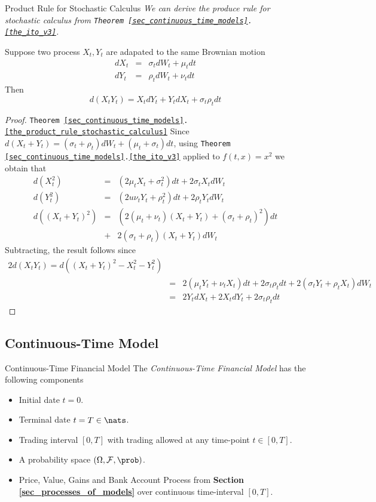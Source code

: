 \documentclass[11pt,a4paper]{article}
\begin{document}
  \begin{theorem}{Product Rule for Stochastic Calculus}\label{the_product_rule_stochastic_calculus}
    \textit{We can derive the produce rule for stochastic calculus from \texttt{Theorem \ref{sec_continuous_time_models}.\ref{the_ito_v3}}.}
    \par Suppose two process $X_t,Y_t$ are adapated to the same Brownian motion
    \[\begin{array}{rcl}
      dX_t&=&\sigma_tdW_t+\mu_tdt\\
      dY_t&=&\rho_tdW_t+\nu_tdt
    \end{array}\]
    Then
    \[ d(X_tY_t)=X_tdY_t+Y_tdX_t+\sigma_t\rho_tdt \]
  \end{theorem}

  \begin{proof}{\texttt{Theorem \ref{sec_continuous_time_models}.\ref{the_product_rule_stochastic_calculus}}}
    Since $d(X_t+Y_t)=(\sigma_t+\rho_t)dW_t+(\mu_t+\sigma_t)dt$, using \texttt{Theorem \ref{sec_continuous_time_models}.\ref{the_ito_v3}} applied to $f(t,x)=x^2$ we obtain that
    \[\begin{array}{rcl}
      d(X_t^2)&=&(2\mu_tX_t+\sigma_t^2)dt+2\sigma_tX_tdW_t\\
      d(Y_t^2)&=&(2u\nu_tY_t+\rho_t^2)dt+2\rho_tY_tdW_t\\
      d((X_t+Y_t)^2)&=&(2(\mu_t+\nu_t)(X_t+Y_t)+(\sigma_t+\rho_t)^2)dt\\
      &+&2(\sigma_t+\rho_t)(X_t+Y_t)dW_t
    \end{array}\]
    Subtracting, the result follows since
    \[\begin{array}{rcl}
      2d(X_tY_t)=d((X_t+Y_t)^2-X_t^2-Y_t^2)\\
      &=&2(\mu_tY_t+\nu_tX_t)dt+2\sigma_t\rho_tdt+2(\sigma_tY_t+\rho_tX_t)dW_t\\
      &=&2Y_tdX_t+2X_tdY_t+2\sigma_t\rho_tdt
    \end{array}\]
    \proved
  \end{proof}

\subsection{Continuous-Time Model}

  \begin{definition}{Continuous-Time Financial Model}
    The \textit{Continuous-Time Financial Model} has the following components
    \begin{itemize}
      \item Initial date $t=0$.
      \item Terminal date $t=T\in\nats$.
      \item Trading interval $[0,T]$ with trading allowed at any time-point $t\in[0,T]$.
      \item A probability space $(\Omega,\mathcal{F},\prob)$.
      \item Price, Value, Gains and Bank Account Process from \textbf{Section \ref{sec_processes_of_models}} over continuous time-interval $[0,T]$.
    \end{itemize}
  \end{definition}
\end{document}
